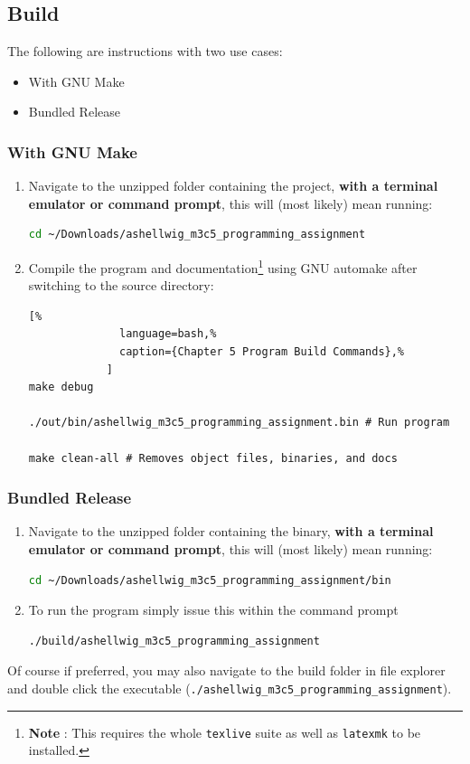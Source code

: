 \documentclass[a4paper, 11pt]{article}
\begin{document}
    \subsection{Build}
      The following are instructions with two use cases:
      \begin{itemize}
        \item With GNU Make
        \item Bundled Release
      \end{itemize}
      \subsubsection{With GNU Make}
        \begin{enumerate}
          \item Navigate to the unzipped folder containing the project,
            \textbf{with a terminal emulator or command prompt}, this will
            (most likely) mean running:
            \begin{lstlisting}[language=bash]
cd ~/Downloads/ashellwig_m3c5_programming_assignment
            \end{lstlisting}
          \item Compile the program and documentation\footnote{\textbf{Note%
            }: This requires the whole \texttt{texlive} suite as well as
            \texttt{latexmk} to be installed.} using GNU automake after
            switching to the source directory:
            \begin{lstlisting}[%
              language=bash,%
              caption={Chapter 5 Program Build Commands},%
            ]
make debug

./out/bin/ashellwig_m3c5_programming_assignment.bin # Run program

make clean-all # Removes object files, binaries, and docs
            \end{lstlisting}
          \end{enumerate}
      \subsubsection{Bundled Release}
        \begin{enumerate}
          \item Navigate to the unzipped folder containing the binary,
            \textbf{with a terminal emulator or command prompt}, this will
            (most likely) mean running:
            \begin{lstlisting}[language=bash]
cd ~/Downloads/ashellwig_m3c5_programming_assignment/bin
            \end{lstlisting}
          \item To run the program simply issue this within the command
            prompt
            \begin{lstlisting}[language=bash]
./build/ashellwig_m3c5_programming_assignment
            \end{lstlisting}
        \end{enumerate}
        Of course if preferred, you may also navigate to the build folder in
          file explorer and double click the executable
          (\texttt{./ashellwig\_m3c5\_programming\_assignment}).
\end{document}
